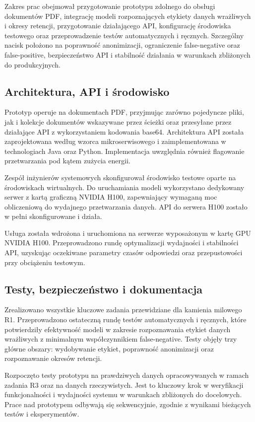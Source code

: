 \documentclass[12pt,a4paper]{report}
\begin{document}
Zakres prac obejmował przygotowanie prototypu zdolnego do obsługi dokumentów PDF, integrację modeli rozpoznających etykiety danych wrażliwych i okresy retencji, przygotowanie działającego API, konfigurację środowiska testowego oraz przeprowadzenie testów automatycznych i ręcznych. Szczególny nacisk położono na poprawność anonimizacji, ograniczenie false-negative oraz false-positive, bezpieczeństwo API i stabilność działania w warunkach zbliżonych do produkcyjnych.

\subsection{Architektura, API i środowisko}
Prototyp operuje na dokumentach PDF, przyjmując zarówno pojedyncze pliki, jak i kolekcje dokumentów wskazywane przez ścieżki oraz przesyłane przez działające API z wykorzystaniem kodowania base64. Architektura API została zaprojektowana według wzorca mikroserwisowego i zaimplementowana w technologiach Java oraz Python. Implementacja uwzględnia również flagowanie przetwarzania pod kątem zużycia energii.

Zespół inżynierów systemowych skonfigurował środowisko testowe oparte na środowiskach wirtualnych. Do uruchamiania modeli wykorzystano dedykowany serwer z kartą graficzną NVIDIA H100, zapewniający wymaganą moc obliczeniową do wydajnego przetwarzania danych. API do serwera H100 zostało w pełni skonfigurowane i działa.

Usługa została wdrożona i uruchomiona na serwerze wyposażonym w kartę GPU NVIDIA H100. Przeprowadzono rundę optymalizacji wydajności i stabilności API, uzyskując oczekiwane parametry czasów odpowiedzi oraz przepustowości przy obciążeniu testowym.

\subsection{Testy, bezpieczeństwo i dokumentacja}
Zrealizowano wszystkie kluczowe zadania przewidziane dla kamienia milowego R1. Przeprowadzono ostateczną rundę testów automatycznych i ręcznych, które potwierdziły efektywność modeli w zakresie rozpoznawania etykiet danych wrażliwych z minimalnym współczynnikiem false-negative. Testy objęły trzy główne obszary: wydobywanie etykiet, poprawność anonimizacji oraz rozpoznawanie okresów retencji.

Rozpoczęto testy prototypu na prawdziwych danych opracowywanych w ramach zadania R3 oraz na danych rzeczywistych. Jest to kluczowy krok w weryfikacji funkcjonalności i wydajności systemu w warunkach zbliżonych do docelowych. Prace nad prototypem odbywają się sekwencyjnie, zgodnie z wynikami bieżących testów i eksperymentów.
\end{document}

